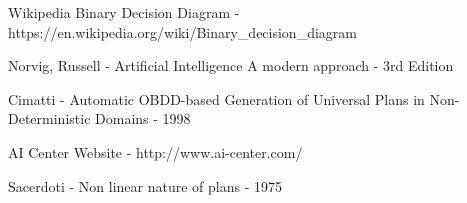 \documentclass[10pt, a4paper,english]{article}
\begin{document}
\begin{footnotesize}
Wikipedia Binary Decision Diagram - https://en.wikipedia.org/wiki/Binary\_decision\_diagram
\end{footnotesize}

\begin{footnotesize}
Norvig, Russell - Artificial Intelligence A modern approach - 3rd Edition 
\end{footnotesize}

\begin{footnotesize}
Cimatti - Automatic OBDD-based Generation of Universal Plans in Non-Deterministic Domains - 1998
\end{footnotesize}

\begin{footnotesize}
AI Center Website - http://www.ai-center.com/
\end{footnotesize}

\begin{footnotesize}
Sacerdoti - Non linear nature of plans - 1975
\end{footnotesize}
\end{document}
